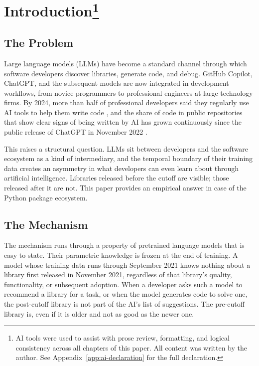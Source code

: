\documentclass[12pt, a4paper]{report}
\begin{document}
\hypersetup{pageanchor=true}  %
\tableofcontents
\newpage
\listoftables
\newpage
\listoffigures
\newpage


\chapter[Introduction]{Introduction\footnote{AI tools were used to assist with prose review, formatting, and logical consistency across all chapters of this paper. All content was written by the author. See Appendix~\ref{app:ai-declaration} for the full declaration.}}\label{ch:intro}
\section{The Problem}\label{sec:intro-problem}
Large language models (LLMs) have become a standard channel through which software developers discover libraries, generate code, and debug. GitHub Copilot, ChatGPT, and the subsequent models are now integrated in development workflows, from novice programmers to professional engineers at large technology firms. By 2024, more than half of professional developers said they regularly use AI tools to help them write code \citep{stackoverflow2024survey}, and the share of code in public repositories that show clear signs of being written by AI has grown continuously since the public release of ChatGPT in November 2022 \citep{daniotti2025who, openai2022chatgpt}.

This raises a structural question. LLMs sit between developers and the software ecosystem as a kind of intermediary, and the temporal boundary of their training data creates an asymmetry in what developers can even learn about through artificial intelligence. Libraries released before the cutoff are visible; those released after it are not. This paper provides an empirical answer in case of the Python package ecosystem.

\section{The Mechanism}\label{sec:intro-mechanism}
The mechanism runs through a property of pretrained language models that is easy to state. Their parametric knowledge is frozen at the end of training. A model whose training data runs through September 2021 knows nothing about a library first released in November 2021, regardless of that library's quality, functionality, or subsequent adoption. When a developer asks such a model to recommend a library for a task, or when the model generates code to solve one, the post-cutoff library is not part of the AI's list of suggestions. The pre-cutoff library is, even if it is older and not as good as the newer one.
\end{document}
